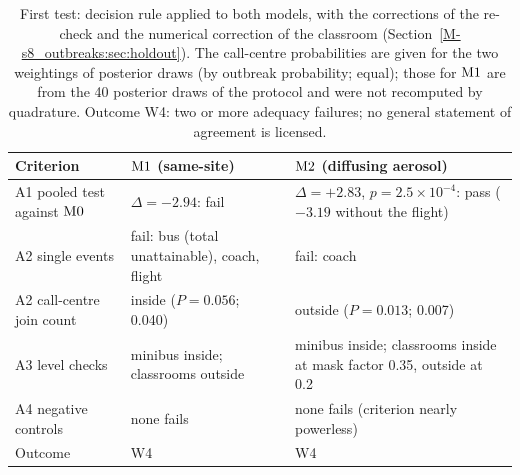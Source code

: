 \begin{table}[tbp]
  \centering\small
  \caption{First test: decision rule applied to both models, with the corrections of the re-check and the
  numerical correction of the classroom (Section~\ref{M-s8_outbreaks:sec:holdout}). The
  call-centre probabilities are given for the two weightings of posterior draws (by outbreak probability;
  equal); those for $\mathrm{M1}$ are from the 40 posterior draws of the protocol and were not recomputed by
  quadrature. Outcome W4: two or more adequacy failures; no general statement of agreement is
  licensed.}
  \label{s8_outbreaks:tab:verdict}
  \begin{tabular}{@{}>{\raggedright\arraybackslash}p{}>{\raggedright\arraybackslash}p{}>{\raggedright\arraybackslash}p{}@{}}
    \toprule
    Criterion & $\mathrm{M1}$ (same-site) & $\mathrm{M2}$ (diffusing aerosol) \\
    \midrule
    A1 pooled test against $\mathrm{M0}$ & $\Delta=-2.94$: fail &
        $\Delta=+2.83$, $p=2.5\times10^{-4}$: pass ($-3.19$ without the flight) \\
    A2 single events & fail: bus (total unattainable), coach, flight & fail: coach \\
    A2 call-centre join count & inside ($P=0.056$; 0.040) & outside ($P=0.013$; 0.007) \\
    A3 level checks & minibus inside; classrooms outside &
        minibus inside; classrooms inside at mask factor 0.35, outside at 0.2 \\
    A4 negative controls & none fails & none fails (criterion nearly powerless) \\
    \midrule
    Outcome & W4 & W4 \\
    \bottomrule
  \end{tabular}
\end{table}

